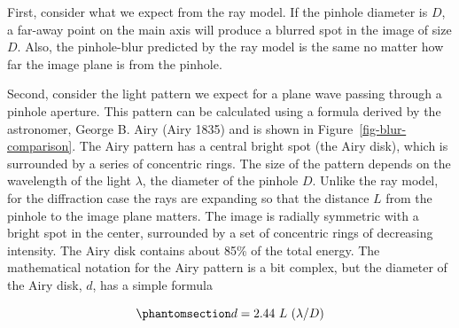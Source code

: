 \documentclass[
  letterpaper,
]{book}
\begin{document}
\begin{figure}



\end{figure}%

First, consider what we expect from the ray model. If the pinhole
diameter is \(D\), a far-away point on the main axis will produce a
blurred spot in the image of size \(D\). Also, the pinhole-blur
predicted by the ray model is the same no matter how far the image plane
is from the pinhole.

Second, consider the light pattern we expect for a plane wave passing
through a pinhole aperture. This pattern can be calculated using a
formula derived by the astronomer, George B. Airy (Airy 1835) and is
shown in Figure~\ref{fig-blur-comparison}. The Airy pattern has a
central bright spot (the Airy disk), which is surrounded by a series of
concentric rings. The size of the pattern depends on the wavelength of
the light \(\lambda\), the diameter of the pinhole \(D\). Unlike the ray
model, for the diffraction case the rays are expanding so that the
distance \(L\) from the pinhole to the image plane matters. The image is
radially symmetric with a bright spot in the center, surrounded by a set
of concentric rings of decreasing intensity. The Airy disk contains
about 85\% of the total energy. The mathematical notation for the Airy
pattern is a bit complex, but the diameter of the Airy disk, \(d\), has
a simple formula

\begin{equation}\phantomsection\label{eq-airy1}{
d = 2.44~L~(\lambda / D)
}\end{equation}
\end{document}
